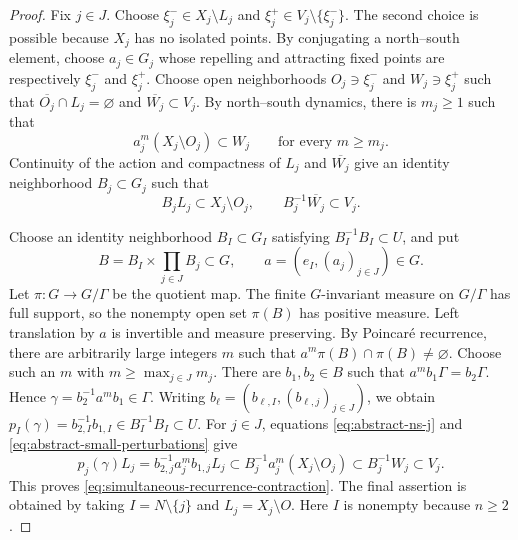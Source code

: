 \documentclass[10pt,a4paper]{amsart}
\begin{document}
	\begin{proof}
		Fix $j\in J$. Choose $\xi_j^-\in X_j\setminus L_j$ and
		$\xi_j^+\in V_j\setminus\{\xi_j^-\}$.
		The second choice is possible because $X_j$ has no isolated points.  By
		conjugating a north--south element, choose $a_j\in G_j$ whose repelling and
		attracting fixed points are respectively $\xi_j^-$ and $\xi_j^+$.  Choose open
		neighborhoods $O_j\ni\xi_j^-$ and $W_j\ni\xi_j^+$ such that
		$\overline{O_j}\cap L_j=\varnothing$ and $\overline{W_j}\subset V_j$.
		By north--south dynamics, there is $m_j\geq1$ such that
		\begin{equation}
			\label{eq:abstract-ns-j}
			a_j^m(X_j\setminus O_j)\subset W_j
			\qquad\text{for every }m\geq m_j.
		\end{equation}
		Continuity of the action and compactness of $L_j$ and $\overline{W_j}$ give an
		identity neighborhood $B_j\subset G_j$ such that
		\begin{equation}
			\label{eq:abstract-small-perturbations}
			B_jL_j\subset X_j\setminus O_j,
			\qquad
			B_j^{-1}\overline{W_j}\subset V_j.
		\end{equation}
		
		Choose an identity neighborhood $B_I\subset G_I$ satisfying
		$B_I^{-1}B_I\subset U$, and put
		\[
		B=B_I\times\prod_{j\in J}B_j\subset G,
		\qquad
		a=(e_I,(a_j)_{j\in J})\in G.
		\]
		Let $\pi:G\to G/\Gamma$ be the quotient map.  The finite $G$-invariant measure
		on $G/\Gamma$ has full support, so the nonempty open set $\pi(B)$ has positive
		measure.  Left translation by $a$ is invertible and measure preserving.  By
		Poincar\'e recurrence, there are arbitrarily large integers $m$ such that
		$a^m\pi(B)\cap\pi(B)\neq\varnothing$.
		Choose such an $m$ with $m\geq\max_{j\in J}m_j$.  There are $b_1,b_2\in B$ such
		that $a^mb_1\Gamma=b_2\Gamma$. Hence
		$\gamma=b_2^{-1}a^mb_1\in\Gamma$. Writing
		$b_\ell=(b_{\ell,I},(b_{\ell,j})_{j\in J})$, we obtain
		$p_I(\gamma)=b_{2,I}^{-1}b_{1,I}\in B_I^{-1}B_I\subset U$.
		For $j\in J$, equations \eqref{eq:abstract-ns-j} and
		\eqref{eq:abstract-small-perturbations} give
		\[p_j(\gamma)L_j
			=b_{2,j}^{-1}a_j^mb_{1,j}L_j
			\subset B_j^{-1}a_j^m(X_j\setminus O_j)
			\subset B_j^{-1}W_j
			\subset V_j.\]
		This proves \eqref{eq:simultaneous-recurrence-contraction}. The final assertion
		is obtained by taking $I=N\setminus\{j\}$ and $L_j=X_j\setminus O$. Here $I$ is
		nonempty because $n\geq2$.
	\end{proof}
\end{document}
